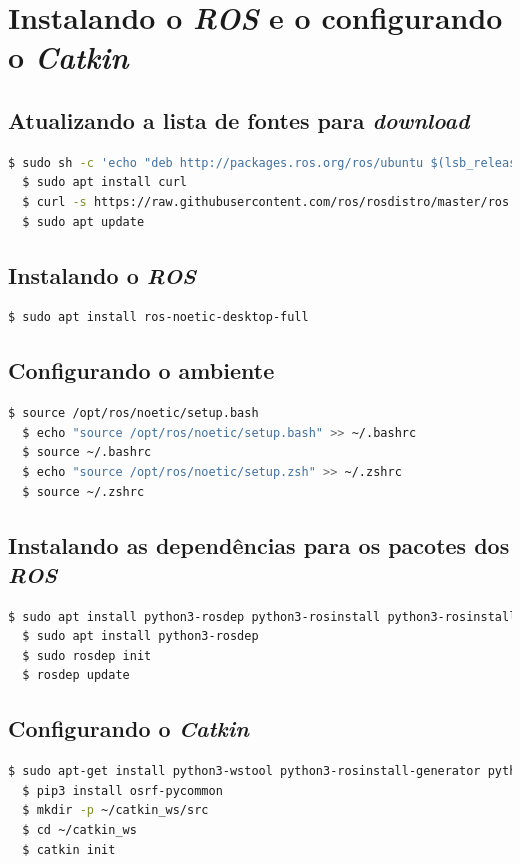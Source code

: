 \documentclass[12pt,a4paper,oneside]{book}
\begin{document}
\section{Instalando o \textit{ROS} e o configurando o \textit{Catkin}}

\subsection{Atualizando a lista de fontes para \textit{download}}
\begin{lstlisting}[language=bash] 
  $ sudo sh -c 'echo "deb http://packages.ros.org/ros/ubuntu $(lsb_release -sc) main" > /etc/apt/sources.list.d/ros-latest.list'
  $ sudo apt install curl
  $ curl -s https://raw.githubusercontent.com/ros/rosdistro/master/ros.asc | sudo apt-key add -
  $ sudo apt update
\end{lstlisting}

\subsection{Instalando o \textit{ROS}}
\begin{lstlisting}[language=bash] 
  $ sudo apt install ros-noetic-desktop-full
\end{lstlisting}

\subsection{Configurando o ambiente}
\begin{lstlisting}[language=bash] 
  $ source /opt/ros/noetic/setup.bash
  $ echo "source /opt/ros/noetic/setup.bash" >> ~/.bashrc
  $ source ~/.bashrc
  $ echo "source /opt/ros/noetic/setup.zsh" >> ~/.zshrc
  $ source ~/.zshrc
\end{lstlisting}

\subsection{Instalando as dependências para os pacotes dos \textit{ROS}}
\begin{lstlisting}[language=bash] 
  $ sudo apt install python3-rosdep python3-rosinstall python3-rosinstall-generator python3-wstool build-essential
  $ sudo apt install python3-rosdep
  $ sudo rosdep init
  $ rosdep update
\end{lstlisting}

\subsection{Configurando o \textit{Catkin}}
\begin{lstlisting}[language=bash] 
  $ sudo apt-get install python3-wstool python3-rosinstall-generator python3-catkin-lint python3-pip python3-catkin-tools
  $ pip3 install osrf-pycommon
  $ mkdir -p ~/catkin_ws/src
  $ cd ~/catkin_ws
  $ catkin init
\end{lstlisting}
\end{document}
